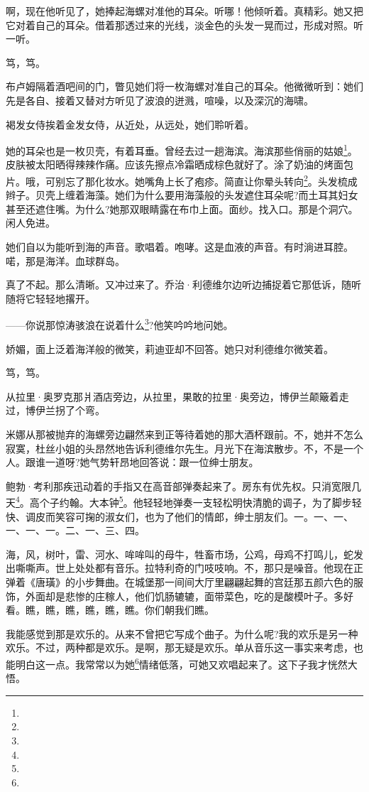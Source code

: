 \par 啊，现在他听见了，她捧起海螺对准他的耳朵。听哪！他倾听着。真精彩。她又把它对着自己的耳朵。借着那透过来的光线，淡金色的头发一晃而过，形成对照。听一听。
\par 笃，笃。
\par 布卢姆隔着酒吧间的门，瞥见她们将一枚海螺对准自己的耳朵。他微微听到：她们先是各自、接着又替对方听见了波浪的迸溅，喧噪，以及深沉的海啸。
\par 褐发女侍挨着金发女侍，从近处，从远处，她们聆听着。
\par 她的耳朵也是一枚贝壳，有着耳垂。曾经去过一趟海滨。海滨那些俏丽的姑娘\footnote{}。皮肤被太阳晒得辣辣作痛。应该先擦点冷霜晒成棕色就好了。涂了奶油的烤面包片。哦，可别忘了那化妆水。她嘴角上长了疱疹。简直让你晕头转向\footnote{}。头发梳成辫子。贝壳上缠着海藻。她们为什么要用海藻般的头发遮住耳朵呢?而土耳其妇女甚至还遮住嘴。为什么?她那双眼睛露在布巾上面。面纱。找入口。那是个洞穴。闲人免进。
\par 她们自以为能听到海的声音。歌唱着。咆哮。这是血液的声音。有时淌进耳腔。喏，那是海洋。血球群岛。
\par 真了不起。那么清晰。又冲过来了。乔治·利德维尔边听边捕捉着它那低诉，随听随将它轻轻地撂开。
\par ——你说那惊涛骇浪在说着什么\footnote{}?他笑吟吟地问她。
\par 娇媚，面上泛着海洋般的微笑，莉迪亚却不回答。她只对利德维尔微笑着。
\par 笃，笃。
\par 从拉里·奥罗克那爿酒店旁边，从拉里，果敢的拉里·奥旁边，博伊兰颠簸着走过，博伊兰拐了个弯。
\par 米娜从那被抛弃的海螺旁边翩然来到正等待着她的那大酒杯跟前。不，她并不怎么寂寞，杜丝小姐的头昂然地告诉利德维尔先生。月光下在海滨散步。不，不是一个人。跟谁一道呀?她气势轩昂地回答说：跟一位绅士朋友。
\par 鲍勃·考利那疾迅动着的手指又在高音部弹奏起来了。房东有优先权。只消宽限几天\footnote{}。高个子约翰。大本钟\footnote{}。他轻轻地弹奏一支轻松明快清脆的调子，为了脚步轻快、调皮而笑容可掬的淑女们，也为了他们的情郎，绅士朋友们。一。一、一、一、一、一。二、一、三、四。
\par 海，风，树叶，雷、河水、哞哞叫的母牛，牲畜市场，公鸡，母鸡不打鸣儿，蛇发出嘶嘶声。世上处处都有音乐。拉特利奇的门吱吱响。不，那只是噪音。他现在正弹着《唐璜》的小步舞曲。在城堡那一间间大厅里翩翩起舞的宫廷那五颜六色的服饰，外面却是悲惨的庄稼人，他们饥肠辘辘，面带菜色，吃的是酸模叶子。多好看。瞧，瞧，瞧，瞧，瞧，瞧。你们朝我们瞧。
\par 我能感觉到那是欢乐的。从来不曾把它写成个曲子。为什么呢?我的欢乐是另一种欢乐。不过，两种都是欢乐。是啊，那无疑是欢乐。单从音乐这一事实来考虑，也能明白这一点。我常常以为她\footnote{}情绪低落，可她又欢唱起来了。这下子我才恍然大悟。
